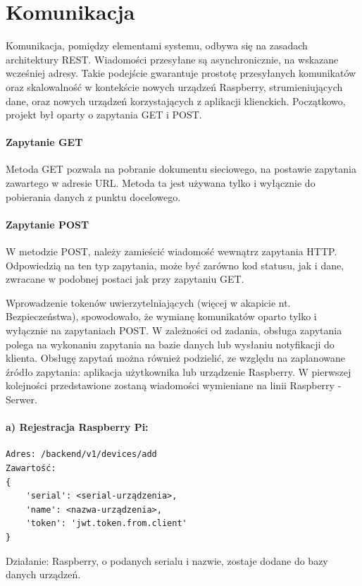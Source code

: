 \section{Komunikacja}

Komunikacja, pomiędzy elementami systemu, odbywa się na zasadach architektury REST. Wiadomości przesyłane są asynchronicznie, na wskazane wcześniej adresy.
Takie podejście gwarantuje prostotę przesyłanych komunikatów oraz skalowalność w kontekście nowych urządzeń Raspberry, strumieniujących dane, oraz nowych urządzeń korzystających z aplikacji klienckich. Początkowo, projekt był oparty o zapytania GET i POST.  \cite{WEBARCH}

\paragraph{Zapytanie GET}
Metoda GET pozwala na pobranie dokumentu sieciowego, na postawie zapytania zawartego w adresie URL. Metoda ta jest używana tylko i wyłącznie do pobierania danych z punktu docelowego. 

\paragraph{Zapytanie POST}
W metodzie POST, należy zamieścić wiadomość wewnątrz zapytania HTTP. Odpowiedzią na ten typ zapytania, może być zarówno kod statusu, jak i dane, zwracane w podobnej postaci jak przy zapytaniu GET.

Wprowadzenie tokenów uwierzytelniających (więcej w akapicie nt. Bezpieczeństwa), spowodowało, że wymianę komunikatów oparto tylko i wyłącznie na zapytaniach POST. 
W zależności od zadania, obsługa zapytania polega na wykonaniu zapytania na bazie danych lub wysłaniu notyfikacji do klienta.
Obsługę zapytań można również podzielić, ze względu na zaplanowane źródło zapytania: aplikacja użytkownika lub urządzenie Raspberry.
W pierwszej kolejności przedstawione zostaną wiadomości wymieniane na linii Raspberry - Serwer.
\paragraph{a) Rejestracja Raspberry Pi:}
\begin{verbatim}
Adres: /backend/v1/devices/add
Zawartość:
{
	'serial': <serial-urządzenia>, 
	'name': <nazwa-urządzenia>, 
	'token': 'jwt.token.from.client'
}
\end{verbatim}
Działanie: Raspberry, o podanych serialu i nazwie, zostaje dodane do bazy danych urządzeń.

